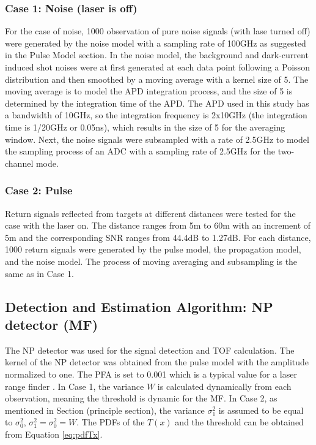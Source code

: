 \subsubsection{Case 1: Noise (laser is off)}
For the case of noise, 1000 observation of pure noise signals (with lase turned off) were generated by the noise model with a sampling rate of 100GHz as suggested in the Pulse Model section. In the noise model, the background and dark-current induced shot noises were at first generated at each data point following a Poisson distribution and then smoothed by a moving average with a kernel size of 5. The moving average is to model the APD integration process, and the size of 5 is determined by the integration time of the APD. The APD used in this study has a bandwidth of 10GHz, so the integration frequency is 2x10GHz (the integration time is 1/20GHz or 0.05ns), which results in the size of 5 for the averaging window. Next, the noise signals were subsampled with a rate of 2.5GHz to model the sampling process of an ADC with a sampling rate of 2.5GHz for the two-channel mode. 
\subsubsection{Case 2: Pulse}
Return signals reflected from targets at different distances were tested for the case with the laser on. The distance ranges from 5m to 60m with an increment of 5m and the corresponding SNR ranges from 44.4dB to 1.27dB. For each distance, 1000 return signals were generated by the pulse model, the propagation model, and the noise model. The process of moving averaging and subsampling is the same as in Case 1. 
\subsection{Detection and Estimation Algorithm: NP detector (MF)}
The NP detector was used for the signal detection and TOF calculation. The kernel of the NP detector was obtained from the pulse model with the amplitude normalized to one. The PFA is set to 0.001 which is a typical value for a laser range finder \citep{burns1991system}. In Case 1, the variance $W$ is calculated dynamically from each observation, meaning the threshold is dynamic for the MF. In Case 2, as mentioned in Section (principle section), the variance $\sigma^2_1$ is assumed to be equal to $\sigma^2_0$, \ie $\sigma^2_1= \sigma^2_0 = W$. The PDFs of the $T(x)$ and the threshold can be obtained from Equation \eqref{eq:pdfTx}.

